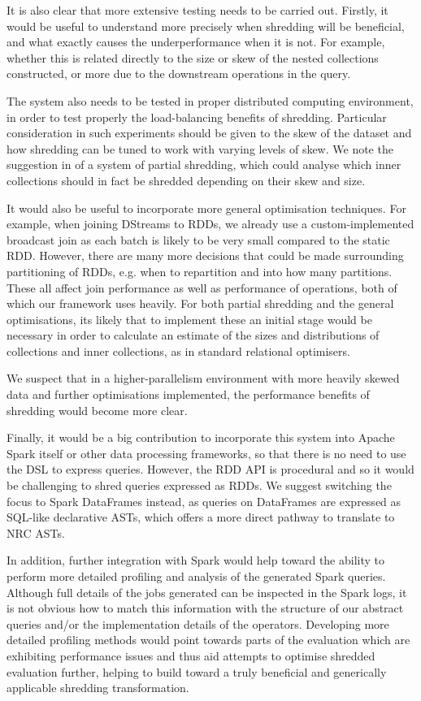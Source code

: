 \vs It is also clear that more extensive testing needs to be carried out. Firstly, it would be useful to understand more precisely when shredding will be beneficial, and what exactly causes the underperformance when it is not. For example, whether this is related directly to the size or skew of the nested collections constructed, or more due to the downstream operations in the query.

The system also needs to be tested in proper distributed computing environment, in order to test properly the load-balancing benefits of shredding. Particular consideration in such experiments should be given to the skew of the dataset and how shredding can be tuned to work with varying levels of skew. We note the suggestion in \cite{draftpaper} of a system of partial shredding, which could analyse which inner collections should in fact be shredded depending on their skew and size.

It would also be useful to incorporate more general optimisation techniques. For example, when joining DStreams to RDDs, we already use a custom-implemented broadcast join as each batch is likely to be very small compared to the static RDD. However, there are many more decisions that could be made surrounding partitioning of RDDs, e.g. when to repartition and into how many partitions. These all affect join performance as well as performance of  operations, both of which our framework uses heavily.
For both partial shredding and the general optimisations, its likely that to implement these an initial stage would be necessary in order to calculate an estimate of the sizes and distributions of collections and inner collections, as in standard relational optimisers.

We suspect that in a higher-parallelism environment with more heavily skewed data and further optimisations implemented, the performance benefits of shredding would become more clear.

\vs Finally, it would be a big contribution to incorporate this system into Apache Spark itself or other data processing frameworks, so that there is no need to use the DSL to express queries. However, the RDD API is procedural and so it would be challenging to shred queries expressed as RDDs. We suggest switching the focus to Spark DataFrames instead, as queries on DataFrames are expressed as SQL-like declarative ASTs, which offers a more direct pathway to translate to NRC ASTs.

In addition, further integration with Spark would help toward the ability to perform more detailed profiling and analysis of the generated Spark queries. Although full details of the jobs generated can be inspected in the Spark logs, it is not obvious how to match this information with the structure of our abstract queries and/or the implementation details of the operators. Developing more detailed profiling methods would point towards parts of the evaluation which are exhibiting performance issues and thus aid attempts to optimise shredded evaluation further, helping to build toward a truly beneficial and generically applicable shredding transformation.
